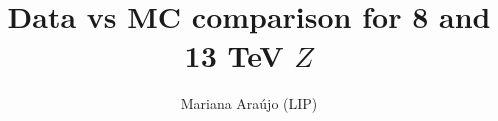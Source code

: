 \documentclass{article}
\begin{document}
\title{Data vs MC comparison for 8 and 13 TeV $Z$}
\author{Mariana Ara\'ujo (LIP)}
\maketitle

\clearpage

\end{document}
